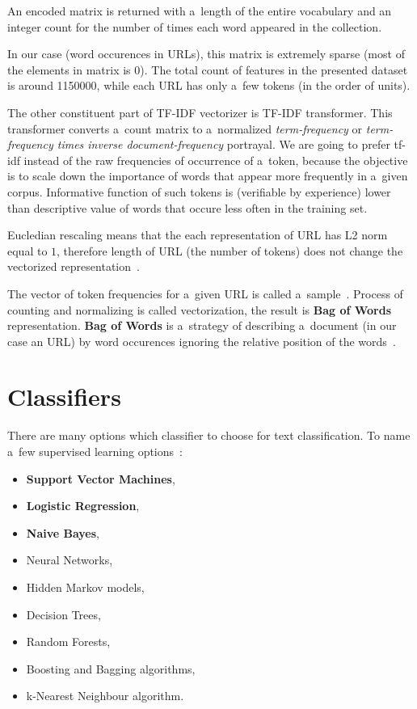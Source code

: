 An encoded matrix is returned with a~length of the entire vocabulary and an integer count for the number of times each word appeared in the collection.

In our case (word occurences in URLs), this matrix is extremely sparse (most of the elements in matrix is \( 0 \)).
The total count of features in the presented dataset is around \num{1150000}, while each URL has only a~few tokens (in the order of units).

The other constituent part of TF-IDF vectorizer is TF-IDF transformer.
This transformer converts a~count matrix to a~normalized \textit{term-frequency} or \textit{term-frequency times inverse document-frequency} portrayal.
We are going to prefer tf-idf instead of the raw frequencies of occurrence of a~token, because the objective is to scale down the importance of words that appear more frequently in a~given corpus.
Informative function of such tokens is (verifiable by experience) lower than descriptive value of words that occure less often in the training set.

Eucledian rescaling means that the each representation of URL has L2 norm equal to \( 1 \), therefore length of URL (the number of tokens) does not change the vectorized representation~\cite{web:stackexchange_l2norm}.

The vector of token frequencies for a~given URL is called a~sample~\cite{scikit-learn}.
Process of counting and normalizing is called vectorization, the result is \textbf{Bag of Words} representation.
\textbf{Bag of Words} is a~strategy of describing a~document (in our case an URL) by word occurences ignoring the relative position of the words~\cite{scikit-learn}.

\newpage
\section{Classifiers}\label{sec:classifiers}

There are many options which classifier to choose for text classification.
To name a~few supervised learning options~\cite{web:popular-text-classifiers}:

\begin{itemize}
    \item \textbf{Support Vector Machines},
    \item \textbf{Logistic Regression},
    \item \textbf{Naive Bayes},
    \item Neural Networks,
    \item Hidden Markov models,
    \item Decision Trees,
    \item Random Forests,
    \item Boosting and Bagging algorithms,
    \item k-Nearest Neighbour algorithm.
\end{itemize}

